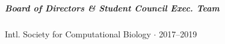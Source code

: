 \documentclass[10pt,letterpaper]{article}
\newcommand{\bigdot}{$\cdot$\xspace}
\begin{document}
\subparagraph{Board of Directors \& Student Council Exec. Team}\hspace{1em}
Intl. Society for Computational Biology  \bigdot 2017--2019
%
\end{document}
